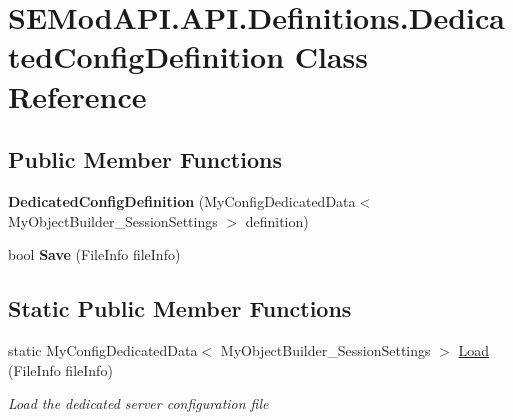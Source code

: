 \hypertarget{class_s_e_mod_a_p_i_1_1_a_p_i_1_1_definitions_1_1_dedicated_config_definition}{}\section{S\+E\+Mod\+A\+P\+I.\+A\+P\+I.\+Definitions.\+Dedicated\+Config\+Definition Class Reference}
\label{class_s_e_mod_a_p_i_1_1_a_p_i_1_1_definitions_1_1_dedicated_config_definition}
\subsection*{Public Member Functions}
\begin{DoxyCompactItemize}
\item 
\hypertarget{class_s_e_mod_a_p_i_1_1_a_p_i_1_1_definitions_1_1_dedicated_config_definition_a046aabab355242aaf82ef7d288d2f896}{}{\bfseries Dedicated\+Config\+Definition} (My\+Config\+Dedicated\+Data$<$ My\+Object\+Builder\+\_\+\+Session\+Settings $>$ definition)\label{class_s_e_mod_a_p_i_1_1_a_p_i_1_1_definitions_1_1_dedicated_config_definition_a046aabab355242aaf82ef7d288d2f896}

\item 
\hypertarget{class_s_e_mod_a_p_i_1_1_a_p_i_1_1_definitions_1_1_dedicated_config_definition_a65952fe18a5941279e4fa8e9bf37e751}{}bool {\bfseries Save} (File\+Info file\+Info)\label{class_s_e_mod_a_p_i_1_1_a_p_i_1_1_definitions_1_1_dedicated_config_definition_a65952fe18a5941279e4fa8e9bf37e751}

\end{DoxyCompactItemize}
\subsection*{Static Public Member Functions}
\begin{DoxyCompactItemize}
\item 
static My\+Config\+Dedicated\+Data$<$ My\+Object\+Builder\+\_\+\+Session\+Settings $>$ \hyperlink{class_s_e_mod_a_p_i_1_1_a_p_i_1_1_definitions_1_1_dedicated_config_definition_aaac246053f8085b53db88e01765bc7cc}{Load} (File\+Info file\+Info)
\begin{DoxyCompactList}\small\item\em Load the dedicated server configuration file \end{DoxyCompactList}\end{DoxyCompactItemize}

